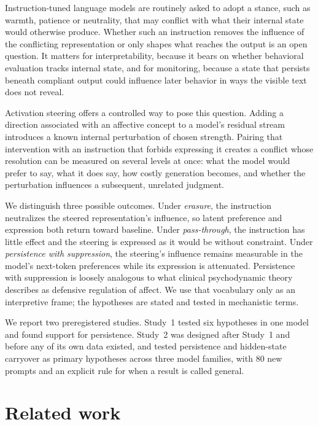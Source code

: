 \documentclass[11pt]{article}
\begin{document}
Instruction-tuned language models are routinely asked to adopt a stance, such as warmth, patience or neutrality, that may conflict with what their internal state would otherwise produce. Whether such an instruction removes the influence of the conflicting representation or only shapes what reaches the output is an open question. It matters for interpretability, because it bears on whether behavioral evaluation tracks internal state, and for monitoring, because a state that persists beneath compliant output could influence later behavior in ways the visible text does not reveal.

Activation steering offers a controlled way to pose this question. Adding a direction associated with an affective concept to a model's residual stream introduces a known internal perturbation of chosen strength. Pairing that intervention with an instruction that forbids expressing it creates a conflict whose resolution can be measured on several levels at once: what the model would prefer to say, what it does say, how costly generation becomes, and whether the perturbation influences a subsequent, unrelated judgment.

We distinguish three possible outcomes. Under \emph{erasure}, the instruction neutralizes the steered representation's influence, so latent preference and expression both return toward baseline. Under \emph{pass-through}, the instruction has little effect and the steering is expressed as it would be without constraint. Under \emph{persistence with suppression}, the steering's influence remains measurable in the model's next-token preferences while its expression is attenuated. Persistence with suppression is loosely analogous to what clinical psychodynamic theory describes as defensive regulation of affect. We use that vocabulary only as an interpretive frame; the hypotheses are stated and tested in mechanistic terms.

We report two preregistered studies. Study~1 tested six hypotheses in one model and found support for persistence. Study~2 was designed after Study~1 and before any of its own data existed, and tested persistence and hidden-state carryover as primary hypotheses across three model families, with 80 new prompts and an explicit rule for when a result is called general.

\section{Related work}
\end{document}
